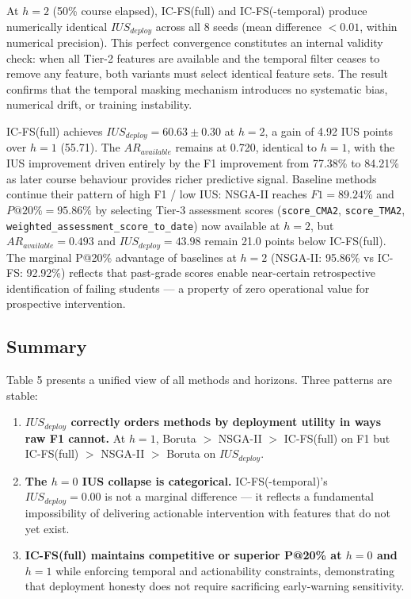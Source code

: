 \documentclass[a4paper,fleqn]{cas-sc}
\begin{document}
At $h=2$ (50\% course elapsed), IC-FS(full) and IC-FS(-temporal) produce numerically identical $IUS_{deploy}$ across all 8 seeds (mean difference $< 0.01$, within numerical precision). This perfect convergence constitutes an internal validity check: when all Tier-2 features are available and the temporal filter ceases to remove any feature, both variants must select identical feature sets. The result confirms that the temporal masking mechanism introduces no systematic bias, numerical drift, or training instability.

IC-FS(full) achieves $IUS_{deploy} = 60.63 \pm 0.30$ at $h=2$, a gain of 4.92 IUS points over $h=1$ (55.71). The $AR_{available}$ remains at 0.720, identical to $h=1$, with the IUS improvement driven entirely by the F1 improvement from 77.38\% to 84.21\% as later course behaviour provides richer predictive signal. Baseline methods continue their pattern of high F1 / low IUS: NSGA-II reaches $F1=89.24\%$ and $P@20\%=95.86\%$ by selecting Tier-3 assessment scores (\texttt{score\_CMA2}, \texttt{score\_TMA2}, \texttt{weighted\_assessment\_score\_to\_date}) now available at $h=2$, but $AR_{available}=0.493$ and $IUS_{deploy}=43.98$ remain 21.0 points below IC-FS(full). The marginal P@20\% advantage of baselines at $h=2$ (NSGA-II: 95.86\% vs IC-FS: 92.92\%) reflects that past-grade scores enable near-certain retrospective identification of failing students --- a property of zero operational value for prospective intervention.

\subsection{Summary}

Table 5 presents a unified view of all methods and horizons. Three patterns are stable:

\begin{enumerate}
    \item \textbf{$IUS_{deploy}$ correctly orders methods by deployment utility in ways raw F1 cannot.} At $h=1$, Boruta $>$ NSGA-II $>$ IC-FS(full) on F1 but IC-FS(full) $>$ NSGA-II $>$ Boruta on $IUS_{deploy}$.

    \item \textbf{The $h=0$ IUS collapse is categorical.} IC-FS(-temporal)'s $IUS_{deploy} = 0.00$ is not a marginal difference --- it reflects a fundamental impossibility of delivering actionable intervention with features that do not yet exist.

    \item \textbf{IC-FS(full) maintains competitive or superior P@20\% at $h=0$ and $h=1$} while enforcing temporal and actionability constraints, demonstrating that deployment honesty does not require sacrificing early-warning sensitivity.
\end{enumerate}
\end{document}
